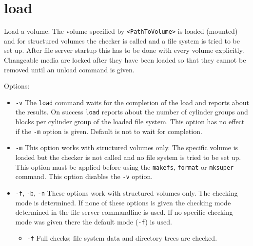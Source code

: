 \section{load}
\begin{man}
  \PP Load a volume.
  \DE The volume specified by {\tt <PathToVolume>} is loaded (mounted)
             and for structured volumes the checker is called and a file system
             is tried to be set up.
             After file server startup this has to be done with every volume
             explicitly.
             Changeable media are locked after they have been loaded so that
             they cannot be removed until an unload command is given.

             Options:
             \begin{itemize}

             \item {\tt -v}\newline
               The {\tt load} command waits for the completion of the load and
               reports about the results. On success {\tt load} reports about the
               number of cylinder groups and blocks per cylinder group of the
               loaded file system. This option has no effect if the {\tt -m} option
               is given. Default is not to wait for completion.

             \item {\tt -m}\newline
               This option works with structured volumes only.
	       The specific volume is loaded but the checker is not called and
	       no file system is tried to be set up. This option must be applied
	       before using the {\tt makefs}, {\tt format} or {\tt mksuper} command.
	       This option disables the {\tt -v} option.

             \item {\tt -f}, {\tt -b}, {\tt -n}\newline
               These options work with structured volumes only.
	       The checking mode is determined. If none of these options is
	       given the checking mode determined in the file server commandline
	       is used. If no specific checking mode was given there the 
               default mode ({\tt -f}) is used.

               \begin{itemize}
               \item {\tt -f}\newline
                 Full checks; file system data and directory trees are checked.


\end{itemize}
\end{itemize}
\end{man}
